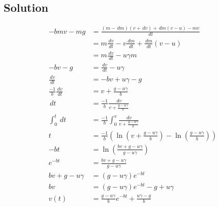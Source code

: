 \documentclass[solutions]{esg8012pset}
\renewcommand{\d}{\,d}
\begin{document}
\subsection*{Solution}
  \begin{align*}
   -b m v - m g & = \frac{(m - \d m)(v + \d v) + \d m (v - u) - m v}{\d t} \\
    & = m\frac{\d v}{\d t} - v\frac{\d m}{\d t} + \frac{\d m}{\d t}(v - u) \\
    & = m\frac{\d v}{\d t} - u\gamma m \\
   -b v - g & = \frac{\d v}{\d t} - u\gamma \\
   \frac{\d v}{\d t} & = -b v + u\gamma - g \\
   \frac{-1}{b}\frac{\d v}{\d t} & = v + \frac{g - u\gamma}{b} \\
   \d t & =\frac{-1}{b}\frac{\d v}{v + \frac{g - u\gamma}{b}} \\
   \int_0^t \d t & = \frac{-1}{b}\int_{0}^{v}\frac{\d v}{v + \frac{g - u\gamma}{b}} \\
   t & = \frac{-1}{b}\left(\ln\left( v + \frac{g - u\gamma}{b}\right) - \ln\left(\frac{g - u\gamma}{b}\right)\right) \\
   -b t & = \ln\left( \frac{b v + g - u\gamma}{g - u\gamma}\right) \\
   e^{-b t} & = \frac{b v + g - u\gamma}{g - u\gamma} \\
   b v + g - u\gamma & = (g - u\gamma)e^{-b t} \\
   b v & = (g - u\gamma)e^{-b t} - g + u\gamma \\
   v(t) & = \frac{g - u\gamma}{b}e^{-b t} + \frac{u\gamma - g}{b}
  \end{align*}
\end{document}
